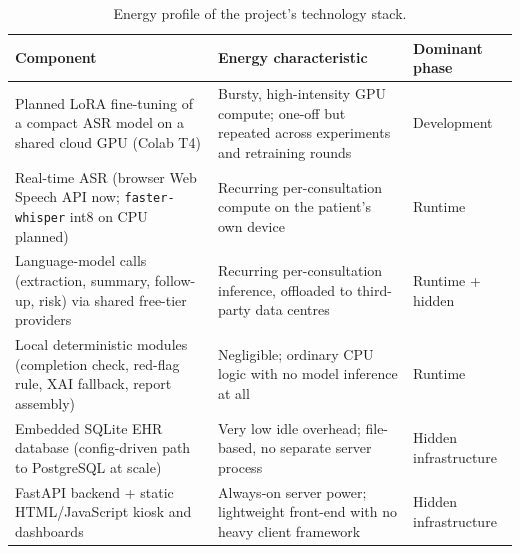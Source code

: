 \documentclass[11pt,a4paper]{article}
\begin{document}
\begin{table}[h]
\centering
\footnotesize
\caption{Energy profile of the project's technology stack.}
\label{tab:stack}
\begin{tabularx}{\textwidth}{@{}p{3.5cm}Lp{2.4cm}@{}}
\toprule
\textbf{Component} & \textbf{Energy characteristic} & \textbf{Dominant phase}\\
\midrule
Planned LoRA fine-tuning of a compact ASR model on a shared cloud GPU (Colab T4)
  & Bursty, high-intensity GPU compute; one-off but repeated across experiments and retraining rounds
  & Development\\
Real-time ASR (browser Web Speech API now; \texttt{faster-whisper} int8 on CPU planned)
  & Recurring per-consultation compute on the patient's own device
  & Runtime\\
Language-model calls (extraction, summary, follow-up, risk) via shared free-tier providers
  & Recurring per-consultation inference, offloaded to third-party data centres
  & Runtime + hidden\\
Local deterministic modules (completion check, red-flag rule, XAI fallback, report assembly)
  & Negligible; ordinary CPU logic with no model inference at all
  & Runtime\\
Embedded SQLite EHR database (config-driven path to PostgreSQL at scale)
  & Very low idle overhead; file-based, no separate server process
  & Hidden infrastructure\\
FastAPI backend + static HTML/JavaScript kiosk and dashboards
  & Always-on server power; lightweight front-end with no heavy client framework
  & Hidden infrastructure\\
\bottomrule
\end{tabularx}
\end{table}
\end{document}
